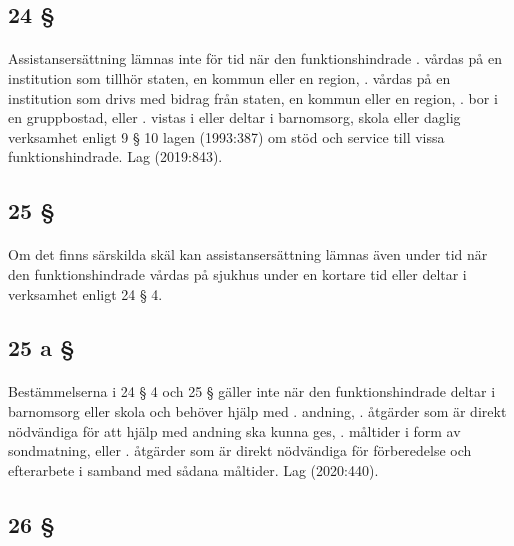 \documentclass[a4paper,notitlepage,openany,10pt]{book}
\begin{document}
\subsection*{24 §}
\paragraph*{}
Assistansersättning lämnas inte för tid när den funktionshindrade
. vårdas på en institution som tillhör staten, en kommun eller en region,
. vårdas på en institution som drivs med bidrag från staten, en kommun eller en region,
. bor i en gruppbostad, eller
. vistas i eller deltar i barnomsorg, skola eller daglig verksamhet enligt 9 § 10 lagen (1993:387) om stöd och service till vissa funktionshindrade.
Lag (2019:843).
\subsection*{25 §}
\paragraph*{}
Om det finns särskilda skäl kan assistansersättning lämnas även under tid när den funktionshindrade vårdas på sjukhus under en kortare tid eller deltar i verksamhet enligt 24 § 4.
\subsection*{25 a §}
\paragraph*{}
Bestämmelserna i 24 § 4 och 25 § gäller inte när den funktionshindrade deltar i barnomsorg eller skola och behöver hjälp med
. andning,
. åtgärder som är direkt nödvändiga för att hjälp med andning ska kunna ges,
. måltider i form av sondmatning, eller
. åtgärder som är direkt nödvändiga för förberedelse och efterarbete i samband med sådana måltider.
Lag (2020:440).
\subsection*{26 §}
\end{document}
